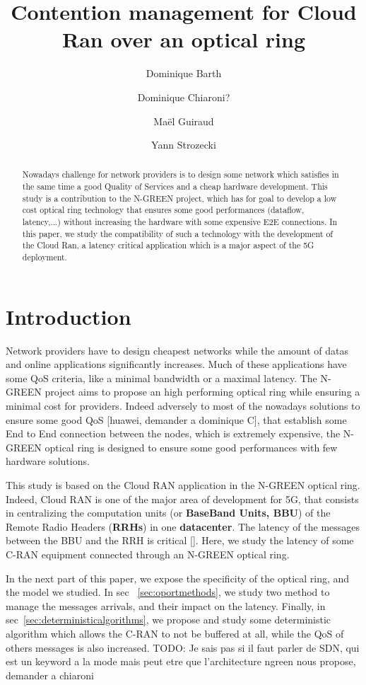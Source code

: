\documentclass[]{algotel}
\title{Contention management for Cloud Ran over an optical ring}
\author{Dominique Barth\addressmark{1}
  \and Dominique Chiaroni?\addressmark{2}
  \and Ma\"el Guiraud \addressmark{1}
   \and Yann Strozecki \addressmark{1}
  }
\newcommand{\todo}[1]{{\color{red} TODO: {#1}}}
\begin{document}
\maketitle


\begin{abstract}
Nowadays challenge for network providers is to design some network which satisfies in the same time a good Quality of Services and a cheap hardware development. This study is a contribution to the N-GREEN project, which has for goal to develop a low cost optical ring technology that ensures some good performances (dataflow, latency,...) without increasing the hardware with some expensive E2E connections. In this paper, we study the compatibility of such a technology with the development of the Cloud Ran, a latency critical application which is a major aspect of the 5G deployment. 
\end{abstract}

\section{Introduction}
Network providers have to design cheapest networks while the amount of datas and online applications significantly increases. Much of these applications have some QoS criteria, like a minimal bandwidth or a maximal latency. The N-GREEN project aims to propose an high performing optical ring while ensuring a minimal cost for providers. Indeed adversely to most of the nowadays solutions to ensure some good QoS [huawei, demander a dominique C], that establish some End to End connection between the nodes, which is extremely expensive, the N-GREEN optical ring is designed to ensure some good performances with few hardware solutions.

This study is based on the Cloud RAN application in the N-GREEN optical ring. Indeed, Cloud RAN is one of the major area of development for 5G, that consists in centralizing the computation units (or {\bf BaseBand Units, BBU}) of the Remote Radio Headers ({\bf RRHs}) in one {\bf datacenter}. The latency of the messages between the BBU and the RRH is critical []. Here, we study the latency of some C-RAN equipment connected through an N-GREEN optical ring.

In the next part of this paper, we expose the specificity of the optical ring, and the model we studied. In sec ~\ref{sec:oportmethods}, we study two method to manage the messages arrivals, and their impact on the latency. Finally, in sec~\ref{sec:deterministicalgorithms}, we propose and study some deterministic algorithm which allows the C-RAN to not be buffered at all, while the QoS of others messages is also increased.
\todo{Je sais pas si il faut parler de SDN, qui est un keyword a la mode mais peut etre que l'architecture ngreen nous propose, demander a chiaroni}
\end{document}
